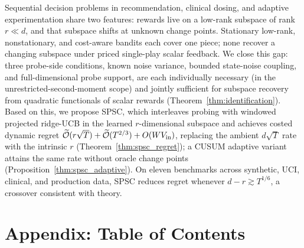 \documentclass{article}
\newcommand{\tilO}{\widetilde{\mathcal{O}}}
\begin{document}
Sequential decision problems in recommendation, clinical dosing,
and adaptive experimentation share two features: rewards live on a
low-rank subspace of rank $r\ll d$, and that subspace shifts at
unknown change points. Stationary low-rank, nonstationary, and
cost-aware bandits each cover one piece; none recover a changing
subspace under priced single-play scalar feedback. We close this
gap: three probe-side conditions, known noise variance, bounded
state-noise coupling, and full-dimensional probe support, are each
individually necessary (in the unrestricted-second-moment scope)
and jointly sufficient for subspace recovery from quadratic
functionals of scalar rewards (Theorem~\ref{thm:identification}). Based on this, we propose SPSC,
which interleaves probing with windowed projected ridge-UCB in the
learned $r$-dimensional subspace and achieves costed dynamic regret
$\tilO(r\sqrt T)+\tilO(T^{2/3})+O(WV_{\rm in})$, replacing the
ambient $d\sqrt T$ rate with the intrinsic $r$
(Theorem~\ref{thm:spsc_regret}); a CUSUM adaptive variant attains
the same rate without oracle change points
(Proposition~\ref{thm:spsc_adaptive}). On eleven benchmarks across
synthetic, UCI, clinical, and production data, SPSC reduces regret
whenever $d-r\gtrsim T^{1/6}$, a crossover consistent with theory.





\clearpage
\appendix

\section*{Appendix: Table of Contents}
\label{app:toc}

\begingroup
\hypersetup{linkcolor=blue}

\newcommand{\tocentry}[3]{%
  \noindent\textbf{#1.}\;\hyperref[#2]{#3}\dotfill\hyperref[#2]{p.\,\pageref*{#2}}\par\vspace{2pt}%
}
\newcommand{\tocsubentry}[3]{%
  \noindent\hspace{1.2em}#1\;\hyperref[#2]{#3}\dotfill\hyperref[#2]{p.\,\pageref*{#2}}\par\vspace{1pt}%
}
\end{document}
